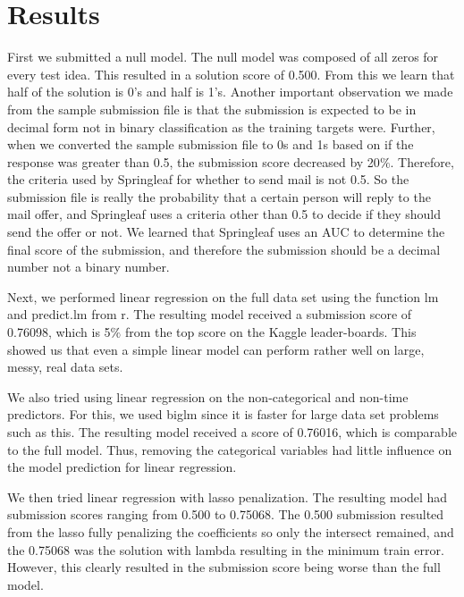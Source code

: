 \documentclass[aps, reprint, groupedaddress, superscriptaddress, amsmath, 10pt]{revtex4-1}
\begin{document}
	
	\section{Results}
	First we submitted a null model.  The null model was composed of all zeros for every test idea.  This resulted in a solution score of 0.500.  From this we learn that half of the solution is 0's and half is 1's.  Another important observation we made from the sample submission file is that the submission is expected to be in decimal form not in binary classification as the training targets were.  Further, when we converted the sample submission file to 0s and 1s based on if the response was greater than 0.5, the submission score decreased by 20$\%$.  Therefore, the criteria used by Springleaf for whether to send mail is not 0.5.  So the submission file is really the probability that a certain person will reply to the mail offer, and Springleaf uses a criteria other than 0.5 to decide if they should send the offer or not.  We learned that Springleaf uses an AUC to determine the final score of the submission, and therefore the submission should be a decimal number not a binary number.
	
	Next, we performed linear regression on the full data set using the function lm and predict.lm from r.  The resulting model received a submission score of 0.76098, which is 5$\%$ from the top score on the Kaggle leader-boards.  This showed us that even a simple linear model can perform rather well on large, messy, real data sets.
		
	We also tried using linear regression on the non-categorical and non-time predictors.  For this, we used biglm since it is faster for large data set problems such as this.  The resulting model received a score of 0.76016, which is comparable to the full model.  Thus, removing the categorical variables had little influence on the model prediction for linear regression.
	
	We then tried linear regression with lasso penalization.  The resulting model had submission scores ranging from 0.500 to 0.75068.  The 0.500 submission resulted from the lasso fully penalizing the coefficients so only the intersect remained, and the 0.75068 was the solution with lambda resulting in the minimum train error.  However, this clearly resulted in the submission score being worse than the full model. 
	
\end{document}
